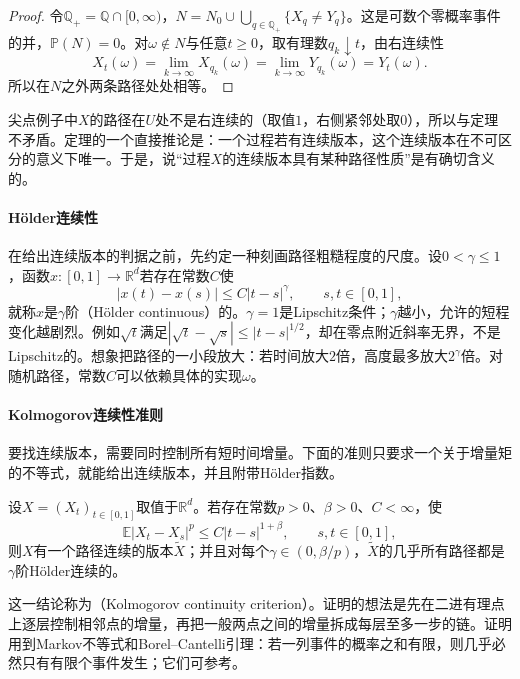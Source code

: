 \begin{proof}
令$\mathbb Q_+=\mathbb Q\cap[0,\infty)$，$N=N_0\cup\bigcup_{q\in\mathbb Q_+}\{X_q\ne Y_q\}$。这是可数个零概率事件的并，$\mathbb P(N)=0$。对$\omega\notin N$与任意$t\ge0$，取有理数$q_k\downarrow t$，由右连续性
\[
  X_t(\omega)=\lim_{k\to\infty}X_{q_k}(\omega)=\lim_{k\to\infty}Y_{q_k}(\omega)=Y_t(\omega).
\]
所以在$N$之外两条路径处处相等。
\end{proof}

尖点例子中$X$的路径在$U$处不是右连续的（取值$1$，右侧紧邻处取$0$），所以与定理不矛盾。定理的一个直接推论是：一个过程若有连续版本，这个连续版本在不可区分的意义下唯一。于是，说“过程$X$的连续版本具有某种路径性质”是有确切含义的。

\paragraph{Hölder连续性}
在给出连续版本的判据之前，先约定一种刻画路径粗糙程度的尺度。设$0<\gamma\le1$，函数$x:[0,1]\to\mathbb R^d$若存在常数$C$使
\[
  |x(t)-x(s)|\le C|t-s|^\gamma,\qquad s,t\in[0,1],
\]
就称$x$是$\gamma$阶（Hölder continuous）的。$\gamma=1$是Lipschitz条件；$\gamma$越小，允许的短程变化越剧烈。例如$\sqrt t$满足$|\sqrt t-\sqrt s|\le|t-s|^{1/2}$，却在零点附近斜率无界，不是Lipschitz的。想象把路径的一小段放大：若时间放大$2$倍，高度最多放大$2^\gamma$倍。对随机路径，常数$C$可以依赖具体的实现$\omega$。

\paragraph{Kolmogorov连续性准则}
要找连续版本，需要同时控制所有短时间增量。下面的准则只要求一个关于增量矩的不等式，就能给出连续版本，并且附带Hölder指数。

\begin{theorem}[Kolmogorov连续性准则]
\label{thm:spp-kolmogorov-continuity}
设$X=(X_t)_{t\in[0,1]}$取值于$\mathbb R^d$。若存在常数$p>0$、$\beta>0$、$C<\infty$，使
\begin{equation}
  \mathbb E|X_t-X_s|^p\le C|t-s|^{1+\beta},\qquad s,t\in[0,1],
  \label{eq:spp-kolmogorov-moment}
\end{equation}
则$X$有一个路径连续的版本$\tilde X$；并且对每个$\gamma\in(0,\beta/p)$，$\tilde X$的几乎所有路径都是$\gamma$阶Hölder连续的。
\end{theorem}

这一结论称为（Kolmogorov continuity criterion）。证明的想法是先在二进有理点上逐层控制相邻点的增量，再把一般两点之间的增量拆成每层至多一步的链。证明用到Markov不等式和Borel--Cantelli引理：若一列事件的概率之和有限，则几乎必然只有有限个事件发生；它们可参考。

